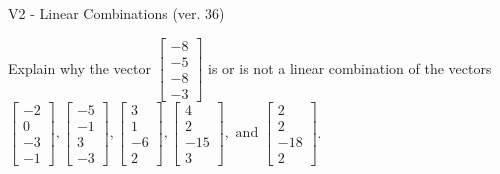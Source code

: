 \begin{exercise}
  \begin{exerciseTitle}V2 - Linear Combinations (ver. 36)\end{exerciseTitle}
  \begin{exerciseStatement}
    Explain why the vector \(\left[\begin{array}{c}
-8 \\
-5 \\
-8 \\
-3
\end{array}\right]\)  is or is not a linear 
	combination of the vectors \(\left[\begin{array}{c}
-2 \\
0 \\
-3 \\
-1
\end{array}\right] , \left[\begin{array}{c}
-5 \\
-1 \\
3 \\
-3
\end{array}\right] , \left[\begin{array}{c}
3 \\
1 \\
-6 \\
2
\end{array}\right] , \left[\begin{array}{c}
4 \\
2 \\
-15 \\
3
\end{array}\right] , \text{ and } \left[\begin{array}{c}
2 \\
2 \\
-18 \\
2
\end{array}\right]\).
	



\end{exerciseStatement}
\end{exercise}
